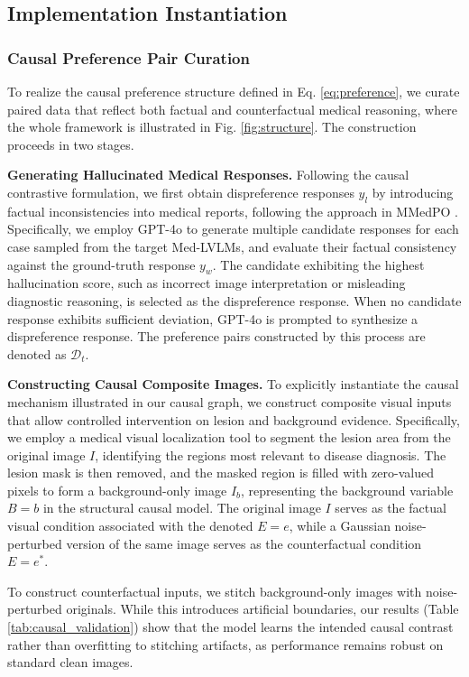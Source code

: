 \subsection{Implementation Instantiation}


\subsubsection{Causal Preference Pair Curation}
To realize the causal preference structure defined in Eq. \ref{eq:preference}, we curate paired data that reflect both factual and counterfactual medical reasoning, where the whole framework is illustrated in Fig. \ref{fig:structure}. The construction proceeds in two stages.

\textbf{Generating Hallucinated Medical Responses.}
Following the causal contrastive formulation, we first obtain dispreference responses $\!y_l\!$ by introducing factual inconsistencies into medical reports, following the approach in MMedPO \cite{Zhu2025MMedPO}. Specifically, we employ GPT-4o \cite{achiam2023gpt} to generate multiple candidate responses for each case sampled from the target Med-LVLMs, and evaluate their factual consistency against the ground-truth response $y_w$. The candidate exhibiting the highest hallucination score, such as incorrect image interpretation or misleading diagnostic reasoning, is selected as the dispreference response. When no candidate response exhibits sufficient deviation, GPT-4o is prompted to synthesize a dispreference response. The preference pairs constructed by this process are denoted as $\mathcal{D}_t$.


\textbf{Constructing Causal Composite Images.}
To explicitly instantiate the causal mechanism illustrated in our causal graph, we construct composite visual inputs that allow controlled intervention on lesion and background evidence. Specifically, we employ a medical visual localization tool to segment the lesion area from the original image $I$, identifying the regions most relevant to disease diagnosis. The lesion mask is then removed, and the masked region is filled with zero-valued pixels to form a background-only image $I_b$, representing the background variable $B{=}b$ in the structural causal model. The original image $I$ serves as the factual visual condition associated with the denoted $E{=}e$, while a Gaussian noise-perturbed version of the same image serves as the counterfactual condition $E{=}e^*$.

To construct counterfactual inputs, we stitch background-only images with noise-perturbed originals. While this introduces artificial boundaries, our results (Table \ref{tab:causal_validation}) show that the model learns the intended causal contrast rather than overfitting to stitching artifacts, as performance remains robust on standard clean images.

